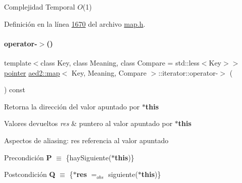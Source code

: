 \begin{DoxyDescription}
\item[Complejidad Temporal]$O$(1)
\end{DoxyDescription}

Definición en la línea \hyperlink{map_8h_source_l01670}{1670} del archivo \hyperlink{map_8h_source}{map.\+h}.

\mbox{\label{classaed2_1_1map_1_1iterator_a712522d62f461c1eb9b02ecf248bae8c_a712522d62f461c1eb9b02ecf248bae8c}} 
\paragraph{\texorpdfstring{operator-\/$>$()}{operator->()}}
{\footnotesize\ttfamily template$<$class Key, class Meaning, class Compare = std\+::less$<$\+Key$>$$>$ \\
\hyperlink{classaed2_1_1map_1_1iterator_a52ea7bdbf1dc6b252aec76633564bdf5_a52ea7bdbf1dc6b252aec76633564bdf5}{pointer} \hyperlink{classaed2_1_1map}{aed2\+::map}$<$ Key, Meaning, Compare $>$\+::iterator\+::operator-\/$>$ (\begin{DoxyParamCaption}{ }\end{DoxyParamCaption}) const\hspace{0.3cm}{\ttfamily [inline]}}



Retorna la dirección del valor apuntado por {\bfseries $\ast$this} 


\begin{DoxyRetVals}{Valores devueltos}
{\em res} & puntero al valor apuntado por {\bfseries $\ast$this}\\
\hline
\end{DoxyRetVals}
\begin{DoxyParagraph}{Aspectos de aliasing\+:}
res referencia al valor apuntado
\end{DoxyParagraph}
\begin{DoxyPrecond}{Precondición}
{\bfseries P} $\equiv$ \{hay\+Siguiente({\bfseries $\ast$this})\} 
\end{DoxyPrecond}
\begin{DoxyPostcond}{Postcondición}
{\bfseries Q} $\equiv$ \{{\bfseries $\ast$res} $=_{obs}$ siguiente({\bfseries $\ast$this})\}
\end{DoxyPostcond}

